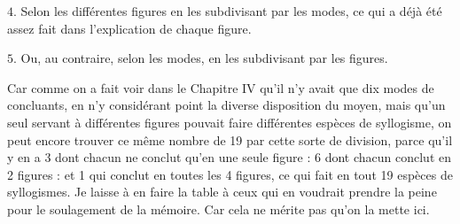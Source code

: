 $4$. Selon les différentes figures en les subdivisant par les modes, ce qui a déjà été assez fait dans l'explication de chaque figure.

\smallbreak
$5$. Ou, au contraire, selon les modes, en les subdivisant par les figures.

Car comme on a fait voir dans le Chapitre IV qu'il n'y avait que dix modes de concluants, en n'y considérant point la diverse disposition du moyen, mais qu'un seul servant à différentes figures pouvait faire différentes espèces de syllogisme, on peut encore trouver ce même nombre de 19 par cette sorte de division, parce qu'il y en a 3 dont chacun ne conclut qu'en une seule figure : 6 dont chacun conclut en 2 figures : et 1 qui conclut en toutes les 4 figures, ce qui fait en tout 19 espèces de syllogismes. Je laisse à en faire la table à ceux qui en voudrait prendre la peine pour le soulagement de la mémoire. Car cela ne mérite pas qu'on la mette ici.

